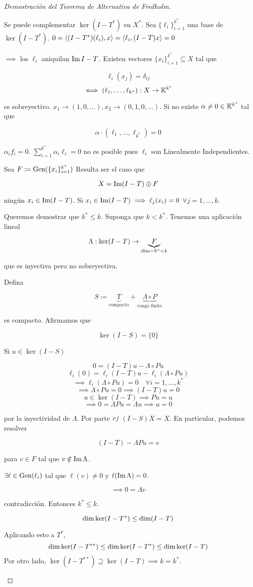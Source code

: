 \begin{proof}[Demostración del Teorema de Alternativa de Fredholm]
\begin{enumerate}[label=\alph*)]
      Se puede complementar $\ker (I-T^*)$ en $X^*$. Sea $\{\ell_i\}_{i=1}^{k^*}$ una base de $\ker (I-T^*)$. $0=\left\langle (I-T^*)(\ell_i),x\right\rangle=\left\langle \ell_i,(I-T)x\right\rangle=0$

      $\implies$ los $\ell_i$ aniquilan $\operatorname{Im} I-T$. Existen vectores $\{x_i\}_{i=1}^{k^*}\subseteq X$ tal que 

      \[\ell_i(x_j)=\delta_{ij}\]
      \[\iff (\ell_1,\ldots,\ell_{k^*}):X\to \mathbb{K}^{k^*}\]

      es sobreyectivo. $x_1\to (1,0,\ldots), x_2\to (0,1,0,\ldots)$. Si no existe $ \alpha\neq 0\in \mathbb{K}^{k^*}$ tal que 

      \[\alpha\cdot (\ell_1,\ldots,\ell_{k^*})=0\]

      $\alpha_i f_i=0$. $\sum_{i=1}^{k^*} \alpha_i\ell_i=0$ no es posible pues $\ell_i$ son Linealmente Independientes.

      Sea $F\coloneqq \operatorname{Gen}(\{x_i\}_{i=1}^{k^*})$ Resulta ser el caso que 

      \[X=\operatorname{Im} (I-T)\oplus F\]

      ningún $x_i\in \operatorname{Im} (I-T)$. Si $x_i\in \operatorname{Im} (I-T)\implies \ell_j(x_i)=0$ $\forall j=1,\ldots,k$.

      Queremos demostrar que $k^*\leq k$. Suponga que $k< k^*$. Tenemos una aplicación lineal 

      \[\Lambda:\ker (I-T)\to \underbrace{F}_{\operatorname{dim}=k^*<k}\]

      que es inyectiva pero no sobreyectiva.

      Defina

      \[S\coloneqq \underbrace{T}_{\text{compacto}}+\underbrace{\Lambda\circ P}_{\text{rango finito}}\]

      es compacto. Afirmamos que 

      \[\ker (I-S)=\{0\}\]

      Si $u\in \ker(I-S)$ 

      \[0=(I-T)u-\Lambda\circ Pu\] 
      \[\ell_i(0)=\ell_i(I-T)u-\ell_i(\Lambda\circ Pu)\]
      \[\implies \ell_i(\Lambda\circ Pu)=0\quad \forall i=1,\ldots,k^*\]
      \[\implies \Lambda\circ Pu=0\implies (I-T)u=0\]
      \[u\in \ker (I-T)\implies Pu=u\]
      \[\implies 0=\Lambda Pu=\Lambda u\implies u=0\]

      por la inyectividad de $\Lambda$. Por parte $\emph{c)}$ $(I-S)X=X$. En particular, podemos resolver 

      \[(I-T)-\Lambda Pu=v\]

      para $v\in F$ tal que $v\notin \operatorname{Im} \Lambda$.

      $\exists \ell \in \operatorname{Gen}(\ell_i)$ tal que $\ell(v)\neq 0$ y $\ell(\operatorname{Im} \Lambda)=0$.

      \[\implies 0=\Lambda v\]

      contradicción. Entonces $k^*\leq k$. 

      \[\operatorname{dim} \ker (I-T^*)\leq \operatorname{dim}(I-T)\]

      Aplicando esto a $T^*$, 
      \[\operatorname{dim}\ker (I-T^{**})\leq \dim\ker (I-T^*)\leq \operatorname{dim}\ker (I-T)\]
      Por otro lado, $\ker (I-T^{**})\supseteq \ker (I-T) \implies k=k^*$.
   \end{enumerate}
\end{proof}